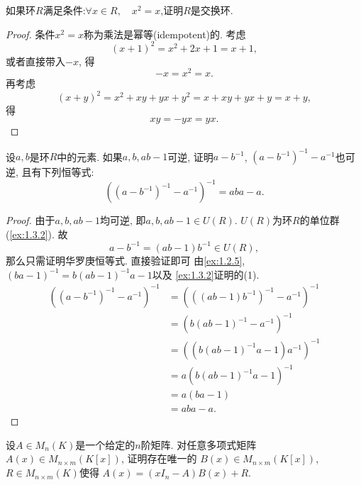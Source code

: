\begin{problem}\label{ex:1.2.6}
    如果环$R$满足条件:$\forall x \in R,\quad x^2 = x$,证明$R$是交换环.
\end{problem}

\begin{proof}
    条件$x^2 = x$称为乘法是幂等(idempotent)的. 考虑
    \[
        (x + 1)^2 = x^2 + 2x + 1 = x + 1,
    \]
    或者直接带入$-x$,
    得
    \[
        -x = x^2 = x.
    \]
    再考虑
    \[
        (x + y)^2 = x^2 + xy + yx + y^2 = x + xy + yx + y = x + y,
    \]
    得
    \[
        xy = -yx = yx.
    \]
\end{proof}

\begin{problem}[华罗庚恒等式]
    设$a, b$是环$R$中的元素. 如果$a, b, ab - 1$可逆, 
证明$a - b^{-1}$, $(a - b^{-1})^{-1} - a^{-1}$也可逆, 且有下列恒等式:
\[
    \left((a - b^{-1})^{-1} - a^{-1}\right)^{-1} = aba - a.
\]
\end{problem}

\begin{proof}
    由于$a, b, ab - 1$均可逆, 即$a, b, ab - 1 \in U(R)$.
$U(R)$为环$R$的单位群(\ref{ex:1.3.2}).
故
    \[
        a - b^{-1} = (ab - 1)b^{-1} \in U(R),
    \]
    那么只需证明华罗庚恒等式. 直接验证即可
    由\ref{ex:1.2.5}, $(ba - 1)^{-1} = b(ab - 1)^{-1}a - 1$以及
    \ref{ex:1.3.2}证明的(1).
    \[
    \begin{aligned}
        \left((a - b^{-1})^{-1} - a^{-1}\right)^{-1} &= \left(((ab - 1)b^{-1})^{-1} - a^{-1}\right)^{-1}\\
        &= (b(ab - 1)^{-1} - a^{-1})^{-1}\\
        &= \left((b(ab - 1)^{-1}a - 1)a^{-1}\right)^{-1}\\
        &= a(b(ab - 1)^{-1}a - 1)^{-1}\\
        &= a(ba - 1)\\
        &= aba - a.
    \end{aligned}
    \]
\end{proof}

\begin{problem}[多项式矩阵的带余除法]\label{ex:1.2.8}
    设$A \in M_n(K)$是一个给定的$n$阶矩阵.
对任意多项式矩阵$A(x) \in M_{n \times m}(K[x])$, 证明存在唯一的
$B(x) \in M_{n \times m}(K[x])$, $R \in M_{n \times m}(K)$使得
$A(x) = (xI_n - A)B(x) + R$.
\end{problem}

